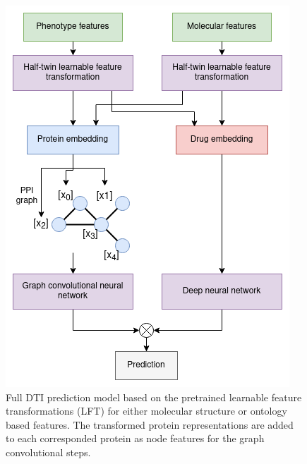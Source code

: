 \documentclass{bioinfo}
\begin{document}
\begin{figure}[!tpb]
	\centering
	\includegraphics[width=0.9\columnwidth]{figures/model_workflow.png}
	\caption{Full DTI prediction model based on the pretrained
          learnable feature transformations (LFT) for either molecular
          structure or ontology based features. The transformed
          protein representations are added to each corresponded
          protein as node features for the graph convolutional
          steps.}
	\label{fig:ModelWorkflow}
\end{figure}
\end{document}

